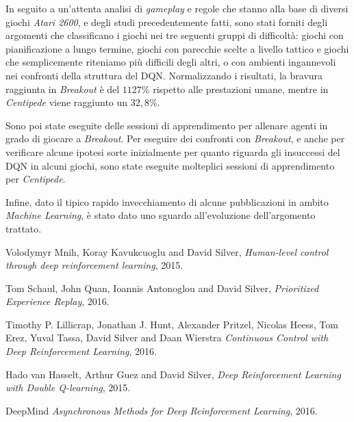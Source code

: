 \documentclass[twoside,twocolumn,10pt]{extarticle}
\theoremstyle{definition}
\begin{document}
		In seguito a un'attenta analisi di \textit{gameplay} e regole che stanno alla base di diversi giochi \textit{Atari 2600}, e degli studi precedentemente fatti, sono stati forniti degli argomenti che classificano i giochi nei tre seguenti gruppi di difficoltà: giochi con pianificazione a lungo termine, giochi con parecchie scelte a livello tattico e giochi che semplicemente riteniamo più difficili degli altri, o con ambienti ingannevoli nei confronti della struttura del DQN. Normalizzando i risultati, la bravura raggiunta in \textit{Breakout} è del $1127\%$ rispetto alle prestazioni umane, mentre in \textit{Centipede} viene raggiunto un $32,8\%$.
		
		Sono poi state eseguite delle sessioni di apprendimento per allenare agenti in grado di giocare a \textit{Breakout}. Per eseguire dei confronti con \textit{Breakout}, e anche per verificare alcune ipotesi sorte inizialmente per quanto riguarda gli insuccessi del DQN in alcuni giochi, sono state eseguite molteplici sessioni di apprendimento per \textit{Centipede}.
		
		Infine, dato il tipico rapido invecchiamento di alcune pubblicazioni in ambito \textit{Machine Learning}, è stato dato uno sguardo all'evoluzione dell'argomento trattato.
	
\begin{thebibliography}{99}	
		Volodymyr Mnih, Koray Kavukcuoglu and David Silver,
		\newblock \emph{Human-level control through deep reinforcement learning},
		2015.
		
		Tom Schaul, John Quan, Ioannis Antonoglou and David Silver,
		\newblock \emph{Prioritized Experience Replay},
		2016.
		
		Timothy P. Lillicrap, Jonathan J. Hunt, Alexander Pritzel, Nicolas Heess,
Tom Erez, Yuval Tassa, David Silver and Daan Wierstra
		\newblock \emph{Continuous Control with Deep Reinforcement Learning},
		2016.
		
		Hado van Hasselt, Arthur Guez and David Silver,
		\newblock \emph{Deep Reinforcement Learning with Double Q-learning},
		2015.
	
		DeepMind
		\newblock \emph{Asynchronous Methods for Deep Reinforcement Learning},
		2016.
\end{thebibliography}
\end{document}
